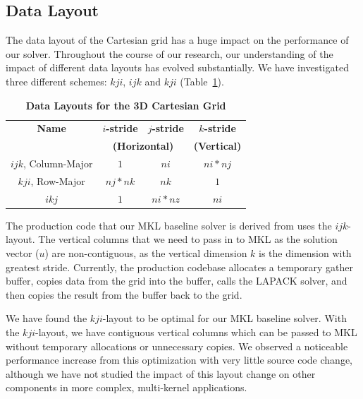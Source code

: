 \documentclass{sig-alternate-05-2015}
\begin{document}
\subsection{Data Layout}
\label{sec:implementation:data_layout}

The data layout of the Cartesian grid has a huge impact on the performance
  of our solver.
Throughout the course of our research, our understanding of the impact of
  different data layouts has evolved substantially.
We have investigated three different schemes: \(kji\), \(ijk\) and \(kji\)
  (Table~\ref{tab:implementation:data_layout:layouts}).

\begin{table}[h]
\centering
\caption{\textbf{Data Layouts for the 3D Cartesian Grid}}
\begin{tabular}[t]{|c|c|c|c|} \hline
\textbf{Name}         & \textbf{\(i\)-stride} & \textbf{\(j\)-stride} & \textbf{\(k\)-stride}   \\\cline{2-3}
                      & \multicolumn{2}{c|}{\textbf{(Horizontal)}}                 & \textbf{(Vertical)} \\ \hline
\(ijk\), Column-Major & \(1\)             & \(ni\)            & \(ni * nj\)         \\ \hline
\(kji\), Row-Major    & \(nj * nk\)       & \(nk\)            & \(1\)               \\ \hline
\(ikj\)               & \(1\)             & \(ni * nz\)       & \(ni\)              \\ \hline
\end{tabular}
\label{tab:implementation:data_layout:layouts}
\end{table}

The production code that our MKL baseline solver is derived from uses the
  \(ijk\)-layout.
The vertical columns that we need to pass in to MKL as the solution vector
  (\(u\)) are non-contiguous, as the vertical dimension \(k\) is the dimension
  with greatest stride.
Currently, the production codebase allocates a temporary gather buffer, copies
  data from the grid into the buffer, calls the LAPACK solver, and then copies
  the result from the buffer back to the grid.

We have found the \(kji\)-layout to be optimal for our MKL baseline solver.
With the \(kji\)-layout, we have contiguous vertical columns which can be
  passed to MKL without temporary allocations or unnecessary copies.
We observed a noticeable performance increase from this optimization with very
  little source code change, although we have not studied the impact of this
  layout change on other components in more complex, multi-kernel applications.
\end{document}
